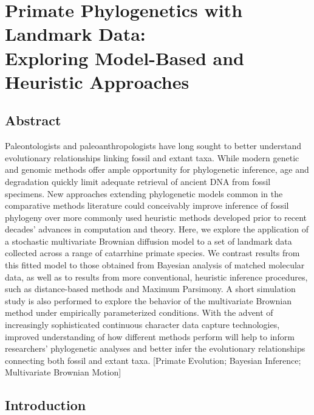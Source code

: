 \chapter[Primate Phylogenetics with Landmark Data]{Primate Phylogenetics with Landmark Data: \\Exploring Model-Based and Heuristic Approaches}

\label{chpt:Chapter3}


\clearpage

\section{Abstract}

Paleontologists and paleoanthropologists have long sought to better understand evolutionary relationships linking fossil and extant taxa. While modern genetic and genomic methods offer ample opportunity for phylogenetic inference, age and degradation quickly limit adequate retrieval of ancient DNA from fossil specimens. New approaches extending phylogenetic models common in the comparative methods literature could conceivably improve inference of fossil phylogeny over more commonly used heuristic methods developed prior to recent decades' advances in computation and theory. Here, we explore the application of a stochastic multivariate Brownian diffusion model to a set of landmark data collected across a range of catarrhine primate species. We contrast results from this fitted model to those obtained from Bayesian analysis of matched molecular data, as well as to results from more conventional, heuristic inference procedures, such as distance-based methods and Maximum Parsimony. A short simulation study is also performed to explore the behavior of the multivariate Brownian method under empirically parameterized conditions. With the advent of increasingly sophisticated continuous character data capture technologies, improved understanding of how different methods perform will help to inform researchers' phylogenetic analyses and better infer the evolutionary relationships connecting both fossil and extant taxa. [Primate Evolution; Bayesian Inference; Multivariate Brownian Motion]

\clearpage

\section{Introduction}

